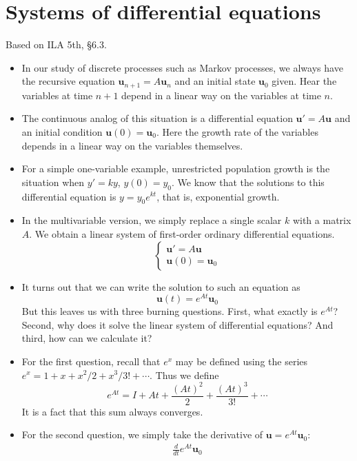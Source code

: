 \documentclass[11pt,oneside]{amsbook}
\theoremstyle{definition}
\theoremstyle{plain}
\theoremstyle{definition}
\theoremstyle{remark}
\numberwithin{equation}{section}
\numberwithin{figure}{section}
\begin{document}
\newpage
\section{Systems of differential equations}

Based on ILA 5th, \S 6.3.

\begin{itemize}
\item In our study of discrete processes such as Markov processes, we always have the recursive equation $\mathbf{u}_{n+1}=A\mathbf{u}_n$ and an initial state $\mathbf{u}_0$ given. Hear the variables at time $n+1$ depend in a linear way on the variables at time $n$.
\item The continuous analog of this situation is a differential equation $\mathbf{u}'=A\mathbf{u}$ and an initial condition $\mathbf{u}(0)=\mathbf{u}_0$. Here the growth rate of the variables depends in a linear way on the variables themselves.
\item For a simple one-variable example, unrestricted population growth is the situation when $y'=ky$, $y(0)=y_0$. We know that the solutions to this differential equation is $y=y_0e^{kt}$, that is, exponential growth.
\item In the multivariable version, we simply replace a single scalar $k$ with a matrix $A$. We obtain a linear system of first-order ordinary differential equations.
  \[\begin{cases}
      \mathbf{u}'=A\mathbf{u}\\
      \mathbf{u}(0)=\mathbf{u}_0
    \end{cases}
  \]
\item It turns out that we can write the solution to such an equation as
  \[\mathbf{u}(t)=e^{At}\mathbf{u}_0
  \]
  But this leaves us with three burning questions. First, what exactly is $e^{At}$? Second, why does it solve the linear system of differential equations? And third, how can we calculate it?
\item For the first question, recall that $e^x$ may be defined using the series $e^x=1+x+x^2/2+x^3/3!+\cdots$. Thus we define
  \[e^{At}=I+At+\frac{(At)^2}{2}+\frac{(At)^3}{3!}+\cdots
  \]
  It is a fact that this sum always converges.
\item For the second question, we simply take the derivative of $\mathbf{u}=e^{At}\mathbf{u}_0$:
  \begin{align*}
    \frac{d}{dt}e^{At}\mathbf{u}_0

\end{align*}
\end{itemize}
\end{document}
